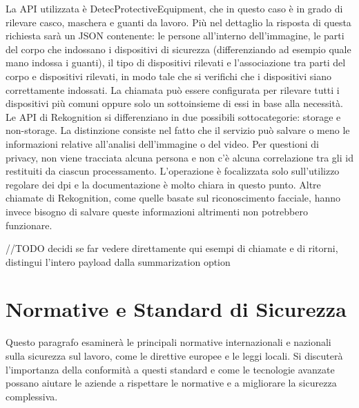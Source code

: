 \noindent La API utilizzata è DetecProtectiveEquipment, che in questo caso è in grado di rilevare casco, maschera e guanti da lavoro. Più nel dettaglio la risposta di questa richiesta sarà un JSON contenente: le persone all'interno dell'immagine, le parti del corpo che indossano i dispositivi di sicurezza (differenziando ad esempio quale mano indossa i guanti), il tipo di dispositivi rilevati e l'associazione tra parti del corpo e dispositivi rilevati, in modo tale che si verifichi che i dispositivi siano correttamente indossati. La chiamata può essere configurata per rilevare tutti i dispositivi più comuni oppure solo un sottoinsieme di essi in base alla necessità. Le API di Rekognition si differenziano in due possibili sottocategorie: storage e non-storage. La distinzione consiste nel fatto che il servizio può salvare o meno le informazioni relative all'analisi dell'immagine o del video. Per questioni di privacy, non viene tracciata alcuna persona e non c'è alcuna correlazione tra gli id restituiti da ciascun processamento. L'operazione è focalizzata solo sull'utilizzo regolare dei dpi e la documentazione è molto chiara in questo punto. Altre chiamate di Rekognition, come quelle basate sul riconoscimento facciale, hanno invece bisogno di salvare queste informazioni altrimenti non potrebbero funzionare.

//TODO decidi se far vedere direttamente qui esempi di chiamate e di ritorni, distingui l'intero payload dalla summarization option

 

\section{Normative e Standard di Sicurezza}

Questo paragrafo esaminerà le principali normative internazionali e nazionali sulla sicurezza sul lavoro, come le direttive europee e le leggi locali. Si discuterà l'importanza della conformità a questi standard e come le tecnologie avanzate possano aiutare le aziende a rispettare le normative e a migliorare la sicurezza complessiva.
